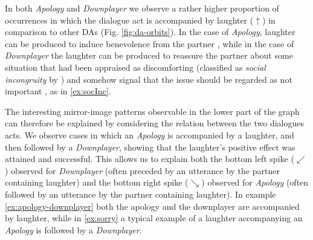 \documentclass[11pt,a4paper]{article}
\begin{document}
In both \textit{Apology} and \textit{Downplayer} we observe a rather
higher proportion of occurrences in which the dialogue act is
accompanied by laughter ($\uparrow$) in comparison to other DAs
(Fig. \ref{fig:da-orbits}). In the case of \textit{Apology}, laughter
can be produced to induce benevolence from the partner
\citep{mazzocconiTAC}, while in the case of \textit{Downplayer} the
laughter can be produced to reassure the partner about some situation
that had been appraised as discomforting (classified as \emph{social
incongruity} by \citealp{mazzocconiTAC}) and somehow signal that the
issue should be regarded %
as not important
\citep{romaniuk2009clinton,gazelaughter}, as in \ref{ex:socInc}.

\begin{lingex}
\item\label{ex:socInc}
  \small
\end{lingex}

The interesting mirror-image %
patterns
observable in the lower part of the graph can therefore be explained
by considering the relation between the two dialogues acts.  We
observe cases in which an \textit{Apology} is accompanied by a
laughter, and then followed by a \textit{Downplayer}, showing 
that the laughter’s positive effect was attained and successful. This
allows us to explain both the bottom left spike ($\swarrow$) observed for
\textit{Downplayer} (often preceded by an utterance by the
partner containing laughter) and the bottom right spike ($\searrow$) observed
for \emph{Apology} (often followed by an utterance by the
partner containing laughter). In example \ref{ex:apology-downplayer}
both the apology and the downplayer are accompanied by laughter, while
in \ref{ex:sorry} a typical example of a laughter accompanying an \emph{Apology}
is followed by a \emph{Downplayer}.
\end{document}
